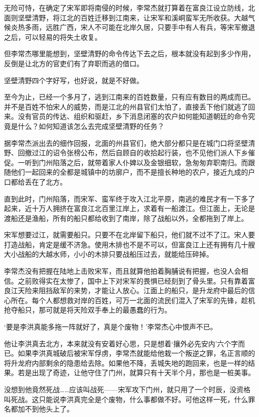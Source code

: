 无险可恃，在确定了宋军即将南侵的时候，李常杰就打算着在富良江设立防线，北面则坚壁清野，将江北的百姓迁移到江南来，让宋军和溪峒蛮军无所收获。大越气候炎热多雨，远胜广西，宋人不可能在北岸久居，只要手中有人有兵，等宋军撤退之后，可以轻易的将失土收复。

但李常杰哪里能想到，坚壁清野的命令传达下去之后，根本就没有起到多少作用，反倒是让北方的官吏们有了弃职而逃的借口。

坚壁清野四个字好写，也好说，就是不好做。

至今为止，已经一个多月了，逃到江南来的百姓数量，只有应有数目的两成而已。并不是百姓不怕宋人的威势，而是江北的州县官们太怕了，直接丢下他们就逃了回来。没有官员的传达、组织和驱赶，乡下消息闭塞的农户如何能知道朝廷的命令究竟是什么？如何知道该怎么去完成坚壁清野的任务？

据李常杰派出去的细作回报，北面的州县官们，绝大部分都只是在城门口将坚壁清野、回撤过江的诏令张榜公布，然后自顾自的收拾起行装，也不见他们派人下乡催促。一听到门州陷落之后，就带着家人仆婢以及金银细软，急匆匆弃职南归。而跟随他们一起回来的全都是城镇中的坊廓户，而不是擅长种地的农户，接近九成的户口都给丢在了北方。

直到此时，门州陷落，而宋军、蛮军终于攻入江北平原，南逃的难民才有一下多了起来，近十万人拥挤在富良江北百里江岸上，求着有一船渡江。但江面上，无论是渡船还是渔船，所有的船只都给收到了南岸，除了战船以外，全都拖到了岸上。

宋军想要过江，就需要船只。只要不在北岸留下船只，他们就不过不了江。宋人要打造战船，肯定是缓不济急。使用木排也不是不可以，但富良江上还有拥有几十艘大小战船的大越水师，小小的木排只要战船压过去，就能给压碎掉。

李常杰没有把握在陆地上击败宋军，而且就算他拍着胸脯说有把握，也没人会相信。之前败得实在太惨了，国中上下对宋军的畏惧已经刻到了骨头里。只有靠着富良江天险来阻挡敌军的来势，才能让人放心。江面上的船只，是升龙府中最后的信心所在。每个人都想救对岸的百姓，可万一北面的流民们混入了宋军的先锋，趁机抢夺船只，那可就是将天险双手奉上的最愚蠢的行为。

‘要是李洪真能多拖一阵就好了，真是个废物！’李常杰心中恨声不已。

他让李洪真去北方，本来就没有安着好心思，只是想着‘攘外必先安内’六个字而已。如果李洪真城破后被宋军俘虏，李常杰就能给他栽一个叛逆之罪，名正言顺的将升龙府内部剩余的隐患给去除。如果他不降，丢城失地的跑回来，也是一样的结果。若是出现了奇迹，让他守住了门州，就算只有十天半个月，那也是一桩美事。

没想到他竟然死战……应该叫战死——宋军攻下门州，就只用了一个时辰，没资格叫死战。这只能说李洪真完全是个废物，什么事都做不好。可他这样一死，什么罪名都加不到他头上了。

